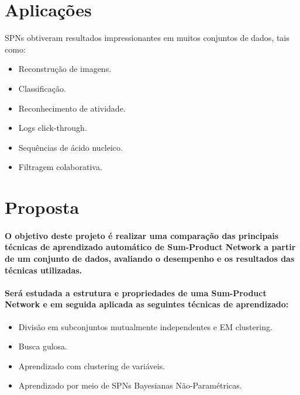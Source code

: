 \documentclass[a4paper,10pt]{article}
\theoremstyle{plain}
\begin{document}
\section{Aplicações}

SPNs obtiveram resultados impressionantes em muitos conjuntos de dados\cite{website:spn-uwashington}, tais como:

\begin{itemize} \itemsep0pt
  \item Reconstrução de imagens.
  \item Classificação.
  \item Reconhecimento de atividade.
  \item Logs click-through.
  \item Sequências de ácido nucleico.
  \item Filtragem colaborativa.
\end{itemize}

\section{Proposta}

\paragraph{
  O objetivo deste projeto é realizar uma comparação das principais técnicas de aprendizado 
automático de Sum-Product Network a partir de um conjunto de dados, avaliando o desempenho 
e os resultados das técnicas utilizadas.
}

\paragraph{
  Será estudada a estrutura e propriedades de uma Sum-Product Network e em seguida
aplicada as seguintes técnicas de aprendizado:
}

\begin{itemize} \itemsep0pt
  \item Divisão em subconjuntos mutualmente independentes e EM clustering.\cite{gens-domingos}  
  \item Busca gulosa.\cite{greedy-search}
  \item Aprendizado com clustering de variáveis.\cite{clustering}
  \item Aprendizado por meio de SPNs Bayesianas Não-Paramétricas.\cite{non-parametric-bayesian}
\end{itemize}
\end{document}

